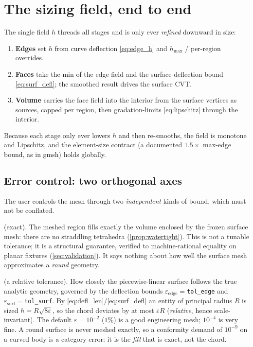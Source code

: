 \documentclass[11pt,a4paper]{article}
\numberwithin{equation}{section}
\DeclareRobustCommand{\code}[1]{\texttt{#1}}
\begin{document}
\section{The sizing field, end to end}
The single field $h$ threads all stages and is only ever \emph{refined}
downward in size:
\begin{enumerate}[topsep=2pt,itemsep=1pt]
\item \textbf{Edges} set $h$ from curve deflection \eqref{eq:edge_h} and
$h_{\max}$ / per-region overrides.
\item \textbf{Faces} take the min of the edge field and the surface deflection
bound \eqref{eq:surf_defl}; the smoothed result drives the surface CVT.
\item \textbf{Volume} carries the face field into the interior from the surface
vertices as sources, capped per region, then gradation-limits
\eqref{eq:lipschitz} through the interior.
\end{enumerate}
Because each stage only ever lowers $h$ and then re-smooths, the field is
monotone and Lipschitz, and the element-size contract (a documented
$1.5\times$ max-edge bound, as in gmsh) holds globally.

\subsection{Error control: two orthogonal axes}
\label{sec:errctl}
The user controls the mesh through two \emph{independent} kinds of bound, which
must not be conflated.
\begin{description}[topsep=2pt,itemsep=2pt,leftmargin=1.4em]
\item[Conformity] (exact). The meshed region fills exactly the volume enclosed
by the frozen surface mesh: there are no straddling tetrahedra
(\cref{prop:watertight}). This is not a tunable tolerance; it is a structural
guarantee, verified to machine-rational equality on planar fixtures
(\cref{sec:validation}). It says nothing about how well the surface mesh
approximates a \emph{round} geometry.
\item[Geometric accuracy] (a relative tolerance). How closely the piecewise-linear
surface follows the true analytic geometry, governed by the deflection bounds
$\varepsilon_{\text{edge}}=$\code{tol\_edge} and $\varepsilon_{\text{surf}}=$\code{tol\_surf}.
By \eqref{eq:defl_len}/\eqref{eq:surf_defl} an entity of principal radius $R$ is
sized $h=R\sqrt{8\varepsilon}$, so the chord deviates by at most $\varepsilon R$
(\emph{relative}, hence scale-invariant). The default $\varepsilon=10^{-2}$
($1\%$) is a good engineering mesh; $10^{-4}$ is very fine. A round surface is
never meshed exactly, so a conformity demand of $10^{-9}$ on a curved body is a
category error: it is the \emph{fill} that is exact, not the chord.
\end{description}
\end{document}
